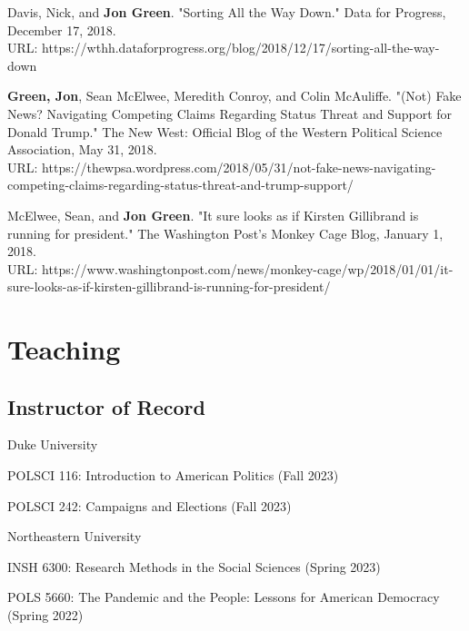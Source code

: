 \documentclass[letterpaper]{article}
\renewenvironment{itemize}{
  \begin{list}{}{
    \setlength{\leftmargin}{1.5em}
  }
}{
  \end{list}
}
\begin{document}
\begin{itemize}
\item Davis, Nick, and \textbf{Jon Green}. "Sorting All the Way Down." Data for Progress, December 17, 2018. \\
URL: https://wthh.dataforprogress.org/blog/2018/12/17/sorting-all-the-way-down

\item \textbf{Green, Jon}, Sean McElwee, Meredith Conroy, and Colin McAuliffe. "(Not) Fake News? Navigating Competing Claims Regarding Status Threat and Support for Donald Trump." The New West: Official Blog of the Western Political Science Association, May 31, 2018. \\
URL: https://thewpsa.wordpress.com/2018/05/31/not-fake-news-navigating-competing-claims-regarding-status-threat-and-trump-support/

\item McElwee, Sean, and \textbf{Jon Green}. "It sure looks as if Kirsten Gillibrand is running for president." The Washington Post's Monkey Cage Blog, January 1, 2018. \\ 
URL: https://www.washingtonpost.com/news/monkey-cage/wp/2018/01/01/it-sure-looks-as-if-kirsten-gillibrand-is-running-for-president/
\end{itemize}

\section*{Teaching}

\subsection*{Instructor of Record}

\begin{itemize}

\item Duke University
	\begin{itemize}
	\item POLSCI 116: Introduction to American Politics (Fall 2023)
	\item POLSCI 242: Campaigns and Elections (Fall 2023)
	\end{itemize}

\item Northeastern University 
	\begin{itemize}
	\item INSH 6300: Research Methods in the Social Sciences (Spring 2023)
	\item POLS 5660: The Pandemic and the People: Lessons for American Democracy (Spring 2022)
	\end{itemize}
\end{itemize}
\end{document}
